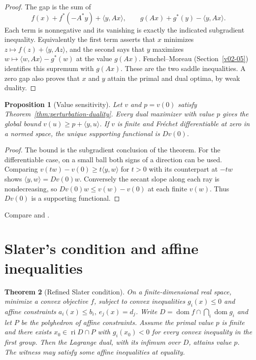 \documentclass[11pt,oneside,openany]{book}
\theoremstyle{plain}
\newtheorem{theorem}{Theorem}[chapter]
\newtheorem{proposition}[theorem]{Proposition}
\theoremstyle{definition}
\theoremstyle{remark}
\begin{document}
\begin{proof}
The gap is the sum of
\[
 f(x)+f^*(-A^*y)+\langle y,Ax\rangle,\qquad
 g(Ax)+g^*(y)-\langle y,Ax\rangle.
\]
Each term is nonnegative and its vanishing is exactly
the indicated subgradient inequality.
Equivalently the first term asserts that \(x\)
minimizes \(z\mapsto f(z)+\langle y,Az\rangle\),
and the second says that \(y\) maximizes
\(w\mapsto\langle w,Ax\rangle-g^*(w)\) at the value
\(g(Ax)\). Fenchel--Moreau (Section~\ref{v02-05})
identifies this supremum with \(g(Ax)\).
These are the two saddle inequalities. A zero gap
also proves that \(x\) and \(y\) attain the primal
and dual optima, by weak duality.
\end{proof}

\begin{proposition}[Value sensitivity]\label{prop:fenchel-sensitivity}
Let \(v\) and \(p=v(0)\) satisfy Theorem~\ref{thm:perturbation-duality}.
Every dual maximizer with value \(p\) gives the global bound
\(v(u)\ge p+\langle y,u\rangle\).
If \(v\) is finite and Fr\'echet differentiable at zero
in a normed space, the unique supporting functional is \(Dv(0)\).
\end{proposition}

\begin{proof}
The bound is the subgradient conclusion of the theorem.
For the differentiable case, on a small ball both
signs of a direction can be used. Comparing
\(v(tw)-v(0)\ge t\langle y,w\rangle\) for \(t>0\)
with its counterpart at \(-tw\) shows
\(\langle y,w\rangle=Dv(0)w\).
Conversely the secant slope along each ray is
nondecreasing, so \(Dv(0)w\le v(w)-v(0)\) at each
finite \(v(w)\). Thus \(Dv(0)\) is a supporting
functional.
\end{proof}

Compare \cite[Chapter III, Sections 2--3]{EkelandTemam}
and \cite[Sections 5.4 and 5.6]{Boyd}.

\section{Slater's condition and affine inequalities}
\label{v04-06}

\begin{theorem}[Refined Slater condition]\label{thm:refined-slater}
On a finite-dimensional real space, minimize a convex
objective \(f\), subject to convex inequalities \(g_i(x)\le0\)
and affine constraints \(a_i(x)\le b_i,\ e_j(x)=d_j\).
Write \(D=\operatorname{dom}f\cap\bigcap_i\operatorname{dom}g_i\)
and let \(P\) be the polyhedron of affine constraints.
Assume the primal value \(p\) is finite and there exists
\(x_0\in\operatorname{ri}D\cap P\) with \(g_i(x_0)<0\)
for every convex inequality in the first group.
Then the Lagrange dual, with its infimum over \(D\),
attains value \(p\). The witness may satisfy some
affine inequalities at equality.
\end{theorem}
\end{document}
